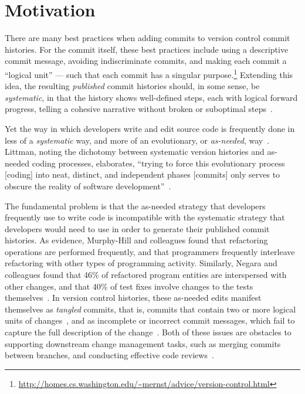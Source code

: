 \documentclass[conference]{IEEEtran}
\newcommand{\purpose}[1]{}
\begin{document}
\section{Motivation}

\purpose{Best practices for version control commit messages.} 
There are many best practices when adding commits to version control commit histories. 
For the commit itself, these best practices include using a descriptive commit message, 
avoiding indiscriminate commits, and making each commit a ``logical unit'' --- such that 
each commit has a singular purpose.\footnote{\url{http://homes.cs.washington.edu/~mernst/advice/version-control.html}} 
Extending this idea, the resulting \emph{published} commit histories should, in some sense, be \emph{systematic}, 
in that the history shows well-defined steps, each with logical forward progress, telling a cohesive narrative without 
broken or suboptimal steps~\cite{Loeliger2012}.

\purpose{Coding activities use a different model than what VCS requires.} 
Yet the way in which developers write and edit source code is frequently done in less of a \emph{systematic} way,
 and more of an evolutionary, or \emph{as-needed}, way~\cite{Perry1989,Littman1987}. 
 Littman, noting the dichotomy between systematic version histories and as-needed coding processes, elaborates, 
 ``trying to force this evolutionary process [coding] into neat, distinct, and independent phases [commits] only serves
  to obscure the reality of software development''~\cite{Littman1987}.

\purpose{Problem is that strategies are incompatible.} 
The fundamental problem is that the as-needed strategy that developers frequently use to write code is incompatible with 
the systematic strategy that developers would need to use in order to generate their published commit histories. 
As evidence, Murphy-Hill and colleagues found that refactoring operations are performed frequently, and that programmers 
frequently interleave refactoring with other types of programming activity. Similarly, Negara and colleagues found that 
46\% of refactored program entities are interspersed with other changes, and that 40\% of test fixes involve changes to the tests themselves~\cite{Negara2012}. In version control histories, these as-needed edits manifest themselves as \emph{tangled} commits, that is, commits that contain two or more logical units of changes~\cite{Kirinuki2014}, and as incomplete or incorrect commit messages, which fail to capture the full description of the change~\cite{Buse2010}. Both of these issues are obstacles to supporting downstream change management tasks, such as merging commits between branches, and conducting effective code reviews~\cite{Kirinuki2014}.
\end{document}
